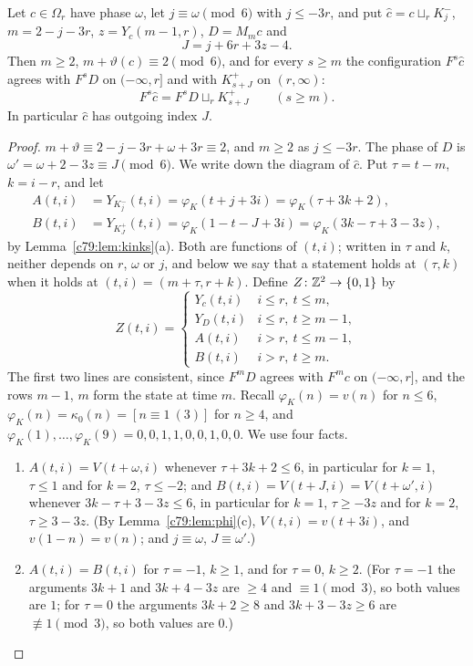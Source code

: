 \begin{lemma}\label{c79:lem:probe}
Let $c\in\Omega_r$ have phase $\omega$, let $j\equiv\omega\pmod 6$ with $j\le-3r$, and put $\hat c=c\sqcup_rK^-_j$, $m=2-j-3r$, $z=Y_c(m-1,r)$, $D=M_mc$ and
\[
J=j+6r+3z-4.
\]
Then $m\ge2$, $m+\vartheta(c)\equiv2\pmod6$, and for every $s\ge m$ the configuration $F^s\hat c$ agrees with $F^sD$ on $(-\infty,r]$ and with $K^+_{s+J}$ on $(r,\infty)$:
\[
F^s\hat c=F^sD\sqcup_rK^+_{s+J}\qquad(s\ge m).
\]
In particular $\hat c$ has outgoing index $J$.
\end{lemma}

\begin{proof}
$m+\vartheta\equiv2-j-3r+\omega+3r\equiv2$, and $m\ge2$ as $j\le-3r$. The phase of $D$ is $\omega'=\omega+2-3z\equiv J\pmod 6$. We write down the diagram of $\hat c$. Put $\tau=t-m$, $k=i-r$, and let
\begin{align*}
A(t,i)&=Y_{K^-_j}(t,i)=\varphi_K(t+j+3i)=\varphi_K(\tau+3k+2),\\
B(t,i)&=Y_{K^+_J}(t,i)=\varphi_K(1-t-J+3i)=\varphi_K(3k-\tau+3-3z),
\end{align*}
by Lemma~\ref{c79:lem:kinks}(a). Both are functions of $(t,i)$; written in $\tau$ and $k$, neither depends on $r$, $\omega$ or $j$, and below we say that a statement holds at $(\tau,k)$ when it holds at $(t,i)=(m+\tau,r+k)$. Define $Z\colon\mathbb{Z}^2\to\{0,1\}$ by
\[
Z(t,i)=\begin{cases}
Y_c(t,i)&i\le r,\ t\le m,\\
Y_D(t,i)&i\le r,\ t\ge m-1,\\
A(t,i)&i>r,\ t\le m-1,\\
B(t,i)&i>r,\ t\ge m.
\end{cases}
\]
The first two lines are consistent, since $F^mD$ agrees with $F^mc$ on $(-\infty,r]$, and the rows $m-1$, $m$ form the state at time $m$. Recall $\varphi_K(n)=v(n)$ for $n\le6$, $\varphi_K(n)=\kappa_0(n)=[n\equiv1\ (3)]$ for $n\ge4$, and $\varphi_K(1),\dots,\varphi_K(9)=0,0,1,1,0,0,1,0,0$. We use four facts.
\begin{enumerate}
\item[(i)] $A(t,i)=V(t+\omega,i)$ whenever $\tau+3k+2\le6$, in particular for $k=1$, $\tau\le1$ and for $k=2$, $\tau\le-2$; and $B(t,i)=V(t+J,i)=V(t+\omega',i)$ whenever $3k-\tau+3-3z\le6$, in particular for $k=1$, $\tau\ge-3z$ and for $k=2$, $\tau\ge3-3z$. (By Lemma~\ref{c79:lem:phi}(c), $V(t,i)=v(t+3i)$, and $v(1-n)=v(n)$; and $j\equiv\omega$, $J\equiv\omega'$.)
\item[(ii)] $A(t,i)=B(t,i)$ for $\tau=-1$, $k\ge1$, and for $\tau=0$, $k\ge2$. (For $\tau=-1$ the arguments $3k+1$ and $3k+4-3z$ are $\ge4$ and $\equiv1\pmod3$, so both values are $1$; for $\tau=0$ the arguments $3k+2\ge8$ and $3k+3-3z\ge6$ are $\not\equiv1\pmod3$, so both values are $0$.)

\end{enumerate}
\end{proof}
